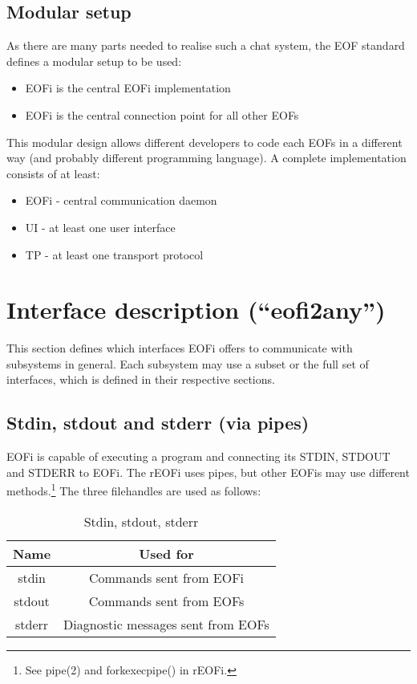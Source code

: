 \documentclass[12pt,a4paper]{book}
\begin{document}
\subsection{Modular setup}
As there are many parts needed to realise such a chat system, the EOF
standard defines a modular setup to be used:
\begin{itemize}
\item EOFi is the central EOFi implementation
\item EOFi is the central connection point for all other EOFs 
\end{itemize}
This modular design allows different developers to code each EOFs
in a different way (and probably different programming language).
A complete implementation consists of at least:
\begin{itemize}
\item EOFi - central communication daemon
\item UI - at least one user interface
\item TP - at least one transport protocol
\end{itemize}
\section{Interface description ("`eofi2any"')}
This section defines which interfaces EOFi offers to communicate with
subsystems in general. Each subsystem may use a subset or the full set
of interfaces, which is defined in their respective sections.
\subsection{Stdin, stdout and stderr (via pipes)}
EOFi is capable of executing a program and connecting its STDIN, STDOUT and
STDERR to EOFi. The rEOFi uses pipes, but other EOFis may use different
methods.\footnote{See pipe(2) and forkexecpipe() in rEOFi.}
The three filehandles are used as follows:
\begin{longtable}{|c|c|}
\caption{Stdin, stdout, stderr}\\
\hline
\textbf{Name} & \textbf{Used for}\\
\hline
stdin & Commands sent from EOFi\\
\hline
stdout & Commands sent from EOFs\\
\hline
stderr & Diagnostic messages sent from EOFs\\
\hline
\end{longtable}
\end{document}
